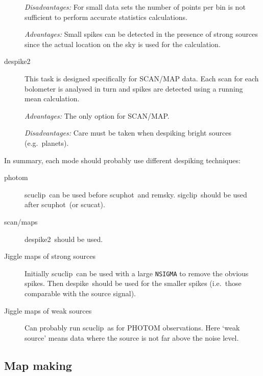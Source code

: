 \documentclass[twoside,11pt]{article}
\newcommand{\task}[1]{{\sf #1}}
\newcommand{\param}[1]{{\tt #1}}
\newcommand{\scuphot}{\htmlref{\task{scuphot}}{SCUPHOT}}
\newcommand{\remsky}{\htmlref{\task{remsky}}{REMSKY}}
\newcommand{\scucat}{\htmlref{\task{scucat}}{SCUCAT}}
\newcommand{\sigclip}{\htmlref{\task{sigclip}}{SIGCLIP}}
\newcommand{\despike}{\htmlref{\task{despike}}{DESPIKE}}
\newcommand{\despikeb}{\htmlref{\task{despike2}}{DESPIKE2}}
\newcommand{\scuclip}{\htmlref{\task{scuclip}}{SCUCLIP}}
\newcommand{\htmlref}[2]{#1}
\begin{document}
\begin{description}
\textit{Disadvantages:} For small data sets the number of points per bin is
not sufficient to perform accurate statistics calculations.

\textit{Advantages:} Small spikes can be detected in the presence of strong
sources since the actual location on the sky is used for the calculation.

\item[\despikeb] \mbox{}

This task is designed specifically for SCAN/MAP data. Each scan for each
bolometer is analysed in turn and spikes are detected using a running mean
calculation. 

\textit{Advantages:} The only option for SCAN/MAP.

\textit{Disadvantages:} Care must be taken when despiking bright sources
(e.g.\ planets).

\end{description}

In summary, each mode should probably use different despiking
techniques:

\begin{description}

\item[photom] \mbox{}

\scuclip\ can be used before \scuphot\ and \remsky. \sigclip\ should be used
after \scuphot\ (or \scucat).

\item[scan/maps] \mbox{}

\despikeb\ should be used.

\item[Jiggle maps of strong sources] \mbox{}

Initially \scuclip\ can be used with a large \param{NSIGMA} to remove the
obvious spikes. Then \despike\ should be used for the smaller spikes (i.e.\
those comparable with the source signal).

\item[Jiggle maps of weak sources] \mbox{}

Can probably run \scuclip\ as for PHOTOM observations. Here `weak source'
means data where the source is not far above the noise level.

\end{description}




\subsection{Map making}
\end{document}
